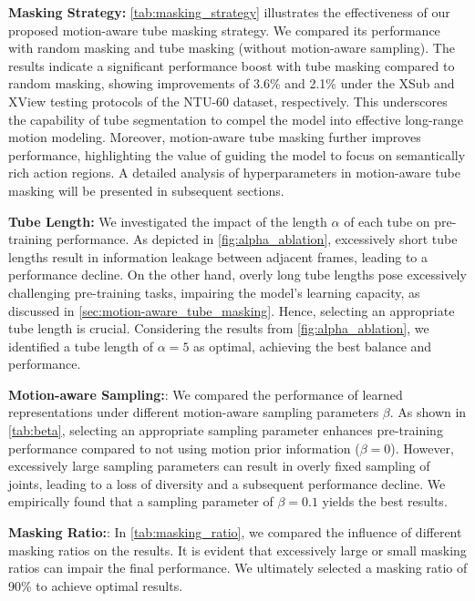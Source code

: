 \noindent \textbf{Masking Strategy:}
\cref{tab:masking_strategy} illustrates the effectiveness of our proposed
motion-aware tube masking strategy. We compared its performance with random masking
and tube masking (without motion-aware sampling). The results indicate a significant
performance boost with tube masking compared to random masking, showing improvements
of 3.6\% and 2.1\% under the XSub and XView testing protocols of the NTU-60 dataset,
respectively. This underscores the capability of tube segmentation to compel the
model into effective long-range motion modeling. Moreover, motion-aware tube masking
further improves performance, highlighting the value of guiding the model to focus
on semantically rich action regions. A detailed analysis of hyperparameters in
motion-aware tube masking will be presented in subsequent sections.

\noindent \textbf{Tube Length:}
We investigated the impact of the length $\alpha$ of each tube on pre-training performance.
As depicted in \cref{fig:alpha_ablation}, excessively short tube lengths result
in information leakage between adjacent frames, leading to a performance decline.
On the other hand, overly long tube lengths pose excessively challenging pre-training
tasks, impairing the model's learning capacity, as discussed in \cref{sec:motion-aware_tube_masking}.
Hence, selecting an appropriate tube length is crucial. Considering the results
from \cref{fig:alpha_ablation}, we identified a tube length of $\alpha=5$ as
optimal, achieving the best balance and performance.

\noindent \textbf{Motion-aware Sampling:}:
We compared the performance of learned representations under different motion-aware
sampling parameters $\beta$. As shown in \cref{tab:beta}, selecting an appropriate
sampling parameter enhances pre-training performance compared to not using
motion prior information ($\beta=0$). However, excessively large sampling parameters
can result in overly fixed sampling of joints, leading to a loss of diversity and
a subsequent performance decline. We empirically found that a sampling parameter of
$\beta=0.1$ yields the best results.

\noindent \textbf{Masking Ratio:}:
In \cref{tab:masking_ratio}, we compared the influence of different masking ratios
on the results. It is evident that excessively large or small masking ratios can
impair the final performance. We ultimately selected a masking ratio of 90\% to
achieve optimal results.